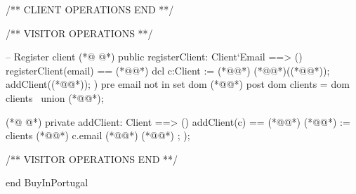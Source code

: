 \begin{vdmpp}[breaklines=true]
 /** CLIENT OPERATIONS END **/
 
 
 /** VISITOR OPERATIONS **/
 
 -- Register client
(*@
\label{registerClient:219}
@*)
 public registerClient: Client`Email ==> ()
 registerClient(email) == (*@\vdmnotcovered{(}@*)
 dcl c:Client := (*@@*) (*@@*)((*@@*));
  addClient((*@@*));
 )
 pre email not in set dom (*@@*)
 post dom clients = dom clients~ union {(*@@*)};

(*@
\label{addClient:227}
@*)
 private addClient: Client ==> ()
 addClient(c) == (*@\vdmnotcovered{(}@*)
  (*@@*) := clients (*@@*) { c.email (*@\vdmnotcovered{|->}@*) (*@@*) };
 );
 
 /** VISITOR OPERATIONS END **/
 

end BuyInPortugal
\end{vdmpp}
\bigskip
